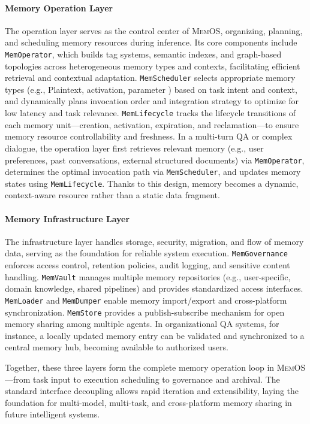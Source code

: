 \documentclass[]{memtensor}
\begin{document}
\paragraph{\textbf{Memory Operation Layer}}
The operation layer serves as the control center of \textsc{MemOS}, organizing, planning, and scheduling memory resources during inference.
Its core components include \texttt{MemOperator}, which builds tag systems, semantic indexes, and graph-based topologies across heterogeneous memory types and contexts, facilitating efficient retrieval and contextual adaptation.
\texttt{MemScheduler} selects appropriate memory types (e.g., Plaintext, activation, parameter ) based on task intent and context, and dynamically plans invocation order and integration strategy to optimize for low latency and task relevance.
\texttt{MemLifecycle} tracks the lifecycle transitions of each memory unit—creation, activation, expiration, and reclamation—to ensure memory resource controllability and freshness.
In a multi-turn QA or complex dialogue, the operation layer first retrieves relevant memory (e.g., user preferences, past conversations, external structured documents) via \texttt{MemOperator}, determines the optimal invocation path via \texttt{MemScheduler}, and updates memory states using \texttt{MemLifecycle}.
Thanks to this design, memory becomes a dynamic, context-aware resource rather than a static data fragment.

\paragraph{\textbf{Memory Infrastructure Layer}}
The infrastructure layer handles storage, security, migration, and flow of memory data, serving as the foundation for reliable system execution.
\texttt{MemGovernance} enforces access control, retention policies, audit logging, and sensitive content handling.
\texttt{MemVault} manages multiple memory repositories (e.g., user-specific, domain knowledge, shared pipelines) and provides standardized access interfaces.
\texttt{MemLoader} and \texttt{MemDumper} enable memory import/export and cross-platform synchronization.
\texttt{MemStore} provides a publish-subscribe mechanism for open memory sharing among multiple agents.
In organizational QA systems, for instance, a locally updated memory entry can be validated and synchronized to a central memory hub, becoming available to authorized users.

Together, these three layers form the complete memory operation loop in \textsc{MemOS}—from task input to execution scheduling to governance and archival. The standard interface decoupling allows rapid iteration and extensibility, laying the foundation for multi-model, multi-task, and cross-platform memory sharing in future intelligent systems.
\end{document}
